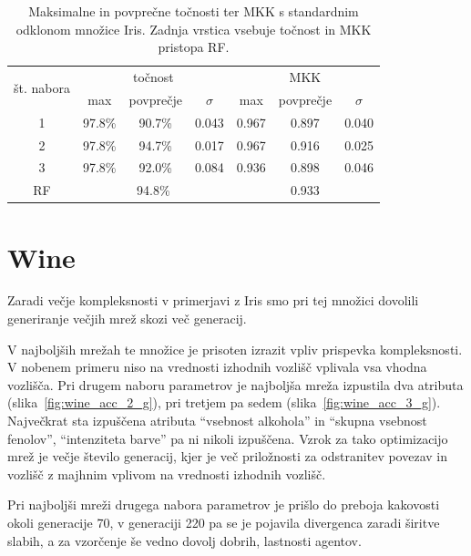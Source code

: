 \documentclass[a4paper,12pt,openright]{book}
\begin{document}
    \begin{table}[H]
        \begin{center}
            \begin{tabular}{|| c | c c c || c c c ||}
                \hline
                \multirow{2}{*}{št. nabora} & \multicolumn{3}{c||}{točnost} & \multicolumn{3}{c||}{MKK} \\ \cline{2-7}
                & max    & povprečje & $\sigma$ & max   & povprečje & $\sigma$ \\
                \hline
                1 & 97.8\% & 90.7\%    & 0.043    & 0.967 & 0.897     & 0.040    \\
                2 & 97.8\% & 94.7\%    & 0.017    & 0.967 & 0.916     & 0.025    \\
                3 & 97.8\% & 92.0\%    & 0.084    & 0.936 & 0.898     & 0.046    \\ \hline
                RF & \multicolumn{3}{c||}{94.8\%} & \multicolumn{3}{c||}{0.933} \\
                \hline
            \end{tabular}
        \end{center}
        \caption{Maksimalne in povprečne točnosti ter MKK s standardnim odklonom množice Iris. Zadnja vrstica vsebuje točnost in MKK pristopa RF.}
        \label{tab:iris_result_aggregate}
    \end{table}


    \section{Wine}\label{sec:rezultati-wine}
    Zaradi večje kompleksnosti v primerjavi z Iris smo pri tej množici dovolili generiranje večjih mrež skozi več generacij.

    V najboljših mrežah te množice je prisoten izrazit vpliv prispevka kompleksnosti.
    V nobenem primeru niso na vrednosti izhodnih vozlišč vplivala vsa vhodna vozlišča.
    Pri drugem naboru parametrov je najboljša mreža izpustila dva atributa (slika~\ref{fig:wine_acc_2_g}), pri tretjem pa sedem (slika~\ref{fig:wine_acc_3_g}).
    Največkrat sta izpuščena atributa \enquote{vsebnost alkohola} in \enquote{skupna vsebnost fenolov},
    \enquote{intenziteta barve} pa ni nikoli izpuščena.
    Vzrok za tako optimizacijo mrež je večje število generacij, kjer je več priložnosti za odstranitev povezav in vozlišč z majhnim
    vplivom na vrednosti izhodnih vozlišč.

    Pri najboljši mreži drugega nabora parametrov je prišlo do preboja kakovosti okoli generacije 70, v generaciji 220
    pa se je pojavila divergenca zaradi širitve slabih, a za vzorčenje še vedno dovolj dobrih, lastnosti agentov.
\end{document}
